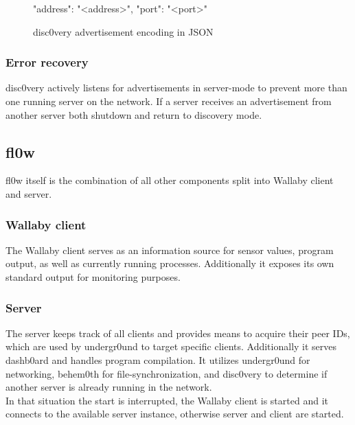 \documentclass[conference]{IEEEtran}
\begin{document}
\begin{figure}[H]
\centering
\begin{json}
{
    "address": "<address>",
    "port": "<port>"
}
\end{json}
\caption{disc0very\cite{disc0very:Christoph Heiss} advertisement encoding in JSON\cite{JSON:T. Bray Ed.}}
\label{fig:discovery_advertisement}
\end{figure}

\subsubsection{Error recovery}
disc0very\cite{disc0very:Christoph Heiss} actively listens for advertisements in server-mode to prevent more than one running server on the network. If a server receives an advertisement from another server both shutdown and return to discovery mode.


\subsection{fl0w}
fl0w\cite{fl0w:Philip Trauner} itself is the combination of all other components split into Wallaby\cite{Wallaby Controller:KIPR} client and server.\\

\subsubsection{Wallaby client}
The Wallaby\cite{Wallaby Controller:KIPR} client serves as an information source for sensor values, program output, as well as currently running processes. Additionally it exposes its own standard output for monitoring purposes.\\

\subsubsection{Server}
The server keeps track of all clients and provides means to acquire their peer IDs, which are used by undergr0und to target specific clients. Additionally it serves dashb0ard\cite{dashb0ard:Sebastian Schaffler} and handles program compilation. It utilizes undergr0und for networking, behem0th for file-synchronization, and disc0very to determine if another server is already running in the network. \\
In that situation the start is interrupted, the Wallaby\cite{Wallaby Controller:KIPR} client is started and it connects to the available server instance, otherwise server and client are started. \\
\end{document}
